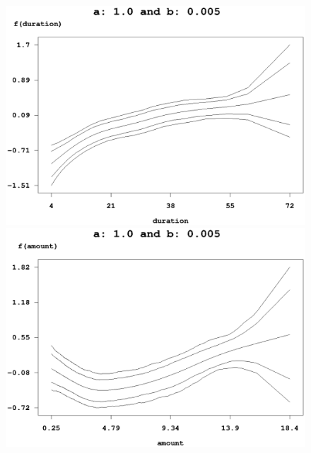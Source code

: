 \begin{figure}[ht]
\begin{center}
\vspace{0.5cm}
\includegraphics[scale=0.4]{grafiken/credit_duration_a1b005.ps} \hspace{0.3cm}
\includegraphics[scale=0.4]{grafiken/credit_amount_a1b005.ps}


\end{center}
\end{figure}
